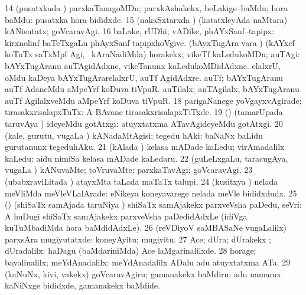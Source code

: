 \num{14} (pusatxkada \vi) parxkaTanagoMDu; parxkAshakekx, beLakige--baMdu; hora baMdu:  pusatxka hora bididxde. 
\num{15} (nakaSxtarxda \vi) (katatxleyAda naMtara) kANisutatx; goVcaravAgi. 
\num{16} baLake, rUDhi, vADike, phAYxSanf--tapipx:  kirxnolinf baTeTxgaLu phAyxSanf tapipxhoVgive. 
 (bAyxTugAra \mo vara \vi) 
\banum
{} (kAYxcf koTuTx saTxMpf Agi, \mo\ kAraNadiMda) horakekx; vikeTf kaLedukoMDu; auTAgi:  bAYxTugAranu auTAgidAdxne, vikeTanunx kaLedukoMDidAdxne.  elalxrU, oMdu kaDeya bAYxTugArarelalxrU, auTf AgidAdxre. 
 auTf; bAYxTugAranu auTf AdaneMdu aMpeYrf koDuva tiVpuR.  auTilalx; auTAgilalx; bAYxTugAranu auTf AgilalxveMdu aMpeYrf koDuva tiVpuR. 
\eanum
\numie
\num{18} parigaNanege yoVgayxvAgirade; tirasakxrisalapxTuTx:  A BAvane tirasakxrisalapxTiTxde. 
\num{19} (\AmA) (tamarUpada taruvAya \parx) ideyeMdu gotAtxgi:  atuyxtatxma ATavAgideyeMdu gotAtxgi. 
\num{20} (kale, gurutu, \mo vugaLa \vi) kANadaMtAgisi; tegedu hAki:  baNaNx baLidu gurutanunx tegeduhAku. 
\num{21} (kAlada \vi) kelasa mADade kaLedu; virAmadalilx kaLedu:  aidu nimiSa kelasa mADade kaLedaru. 
\num{22} (guLeLxgaLu, taracugAya, \mo vugaLa \vi) kANuvaMte; toVruvaMte; parxkaTavAgi; goVcaravAgi. 
\num{23} (ubabxraviLitada \vi) atayxMta taLada maTaTx talupi. 
\num{24} (kusitxya \vi) nelada meVliMda meVleVLalArade:  eNikeya koneyavarege nelada meVle bididxdudx. 
\num{25} (\pArxparx) (shiSaTx samAjada taruNiya \vi) shiSaTx samAjakekx parxveVsha paDedu, seVri:  A huDugi shiSaTx samAjakekx parxveVsha paDedidAdxLe (idiVga kuTuMbadiMda hora baMdidAdxLe). 
\num{26} (reVDiyoV saMBASaNe \mo vugaLalilx) parxsAra mugiyutatxde:  koneyAyitu; mugiyitu. 
\num{27} Ace; dUra; dUrakekx ; dUradalilx:  haDagu (baMdariniMda) Ace laMgarinalilxde. 
\num{28} horage; bayalinalilx; meYdAnadalilx:  meYdAnadalilx ADalu adu atuyxtatxma ATa. 
\num{29} (kaNuNx, kivi, \mo vakekx) goVcaravAgiru; gamanakekx baMdiru:  adu namamx kaNiNxge bididxde, gamanakekx baMdide. 
\enum
\emng


